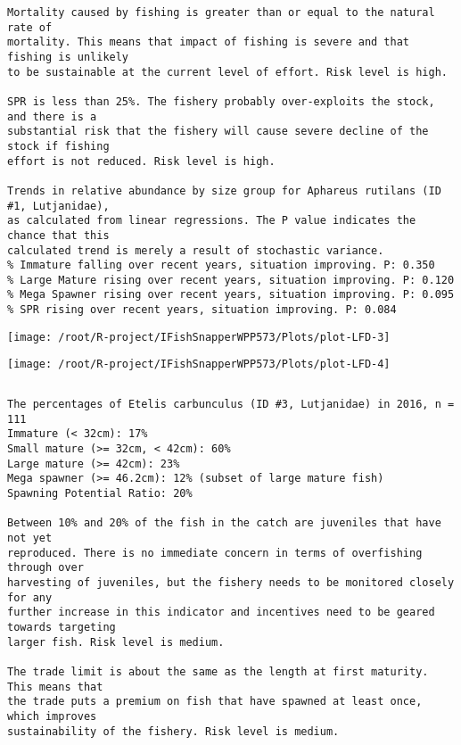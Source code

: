 \documentclass{report}\usepackage[]{graphicx}\usepackage[]{color}
\makeatletter
\def\maxwidth{ %
  \ifdim\Gin@nat@width>\linewidth
    \linewidth
  \else
    \Gin@nat@width
  \fi
}
\newenvironment{kframe}{%
 \def\at@end@of@kframe{}%
 \ifinner\ifhmode%
  \def\at@end@of@kframe{\end{minipage}}%
  \begin{minipage}{\columnwidth}%
 \fi\fi%
 \def\FrameCommand##1{\hskip\@totalleftmargin \hskip-\fboxsep
 \colorbox{shadecolor}{##1}\hskip-\fboxsep
     \hskip-\linewidth \hskip-\@totalleftmargin \hskip\columnwidth}%
 \MakeFramed {\advance\hsize-\width
   \@totalleftmargin\z@ \linewidth\hsize
   \@setminipage}}%
 {\par\unskip\endMakeFramed%
 \at@end@of@kframe}
\newenvironment{knitrout}{}{} %
\makeatother
\begin{document}
\begin{knitrout}
\begin{kframe}
\begin{verbatim}
Mortality caused by fishing is greater than or equal to the natural rate of
mortality. This means that impact of fishing is severe and that fishing is unlikely
to be sustainable at the current level of effort. Risk level is high.
 
SPR is less than 25%. The fishery probably over-exploits the stock, and there is a
substantial risk that the fishery will cause severe decline of the stock if fishing
effort is not reduced. Risk level is high.
 
Trends in relative abundance by size group for Aphareus rutilans (ID #1, Lutjanidae),
as calculated from linear regressions. The P value indicates the chance that this
calculated trend is merely a result of stochastic variance.
% Immature falling over recent years, situation improving. P: 0.350
% Large Mature rising over recent years, situation improving. P: 0.120
% Mega Spawner rising over recent years, situation improving. P: 0.095
% SPR rising over recent years, situation improving. P: 0.084
\end{verbatim}
\end{kframe}
\texttt{[image: /root/R-project/IFishSnapperWPP573/Plots/plot-LFD-3]} 

\texttt{[image: /root/R-project/IFishSnapperWPP573/Plots/plot-LFD-4]} 
\begin{kframe}\begin{verbatim}
\end{verbatim}
\end{kframe}
\clearpage
\newpage
\begin{kframe}\begin{verbatim}The percentages of Etelis carbunculus (ID #3, Lutjanidae) in 2016, n = 111
Immature (< 32cm): 17%
Small mature (>= 32cm, < 42cm): 60%
Large mature (>= 42cm): 23%
Mega spawner (>= 46.2cm): 12% (subset of large mature fish)
Spawning Potential Ratio: 20%
 
Between 10% and 20% of the fish in the catch are juveniles that have not yet
reproduced. There is no immediate concern in terms of overfishing through over
harvesting of juveniles, but the fishery needs to be monitored closely for any
further increase in this indicator and incentives need to be geared towards targeting
larger fish. Risk level is medium.

The trade limit is about the same as the length at first maturity.  This means that
the trade puts a premium on fish that have spawned at least once, which improves
sustainability of the fishery. Risk level is medium.


\end{verbatim}
\end{kframe}
\end{knitrout}
\end{document}
